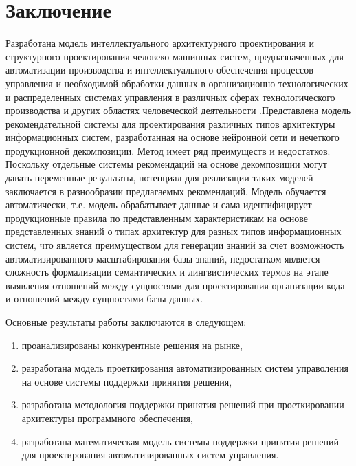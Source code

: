 \chapter*{Заключение}                       %


Разработана модель интеллектуального архитектурного проектирования и структурного проектирования человеко-машинных систем, предназначенных для автоматизации производства и интеллектуального обеспечения процессов управления и необходимой обработки данных в организационно-технологических и распределенных системах управления в различных сферах технологического производства и других областях человеческой деятельности .Представлена модель рекомендательной системы для проектирования различных типов архитектуры информационных систем, разработанная на основе нейронной сети и нечеткого продукционной декомпозиции. Метод имеет ряд преимуществ и недостатков. Поскольку отдельные системы рекомендаций на основе декомпозиции могут давать переменные результаты, потенциал для реализации таких моделей заключается в разнообразии предлагаемых рекомендаций. Модель обучается автоматически, т.е. модель обрабатывает данные и сама идентифицирует продукционные правила по представленным характеристикам на основе представленных знаний о типах архитектур для разных типов информационных систем, что является преимуществом для генерации знаний за счет возможность автоматизированного масштабирования базы знаний, недостатком является сложность формализации семантических и лингвистических термов на этапе выявления отношений между сущностями для проектирования организации кода и отношений между сущностями базы данных.

Основные результаты работы заключаются в следующем:
\begin{enumerate}
	\item проанализированы конкурентные решения на рынке,
	\item разработана модель проеткирования автоматизированных систем управоления на основе системы поддержки принятия решения,
	\item разработана методология поддержки принятия решений при проеткировании архитектуры программного обеспечения,
	\item разработана математическая модель системы поддержки принятия решений для проектирования автоматизированных систем управления.
\end{enumerate}


